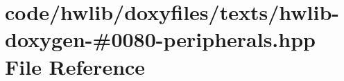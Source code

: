 \hypertarget{hwlib-doxygen-#0080-peripherals_8hpp}{}\section{code/hwlib/doxyfiles/texts/hwlib-\/doxygen-\/\#0080-\/peripherals.hpp File Reference}
\label{hwlib-doxygen-#0080-peripherals_8hpp}
